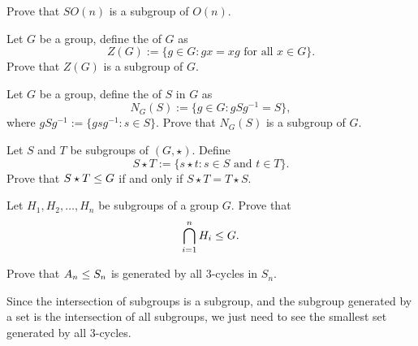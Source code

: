 \documentclass{ximera}
\begin{document}
\begin{exercise}
  Prove that $SO(n)$ is a subgroup of $O(n)$.
\end{exercise}


\begin{exercise}\label{E:center}
  Let $G$ be a group, define the  of $G$ as
  \[
  Z(G):=\{g\in G: \text{$gx=xg$ for all $x\in G$}\}.
  \]
  Prove that $Z(G)$ is a subgroup of $G$.
\end{exercise}


\begin{exercise}
  Let $G$ be a group, define the  of $S$ in $G$ as
  \[
  N_G(S):=\{g\in G: \text{$gSg^{-1} = S$}\},
  \]
  where $gSg^{-1}:=\{g sg^{-1}:s\in S\}$. Prove that $N_G(S)$ is a
  subgroup of $G$.
\end{exercise}



\begin{exercise}
  Let $S$ and $T$ be subgroups of $(G,\star)$. Define
  \[
  S\star T := \{ s\star t: \text{$s\in S$ and $t\in T$}\}.
  \]
  Prove that $S\star T\leq G$ if and only if $S\star T = T\star S$.
\end{exercise}






\begin{exercise}
  Let $H_1,H_2,\dots,H_n$ be subgroups of a group $G$. Prove that
  \[
  \bigcap_{i=1}^n H_i \leq G.
  \]
\end{exercise}





\begin{exercise}
  Prove that $A_n\leq S_n$ is generated by all $3$-cycles in $S_n$.
  \begin{hint}
    Since the intersection of subgroups is a subgroup, and the
    subgroup generated by a set is the intersection of all subgroups,
    we just need to see the smallest set generated by all $3$-cycles. 
  \end{hint}
\end{exercise}
\end{document}
